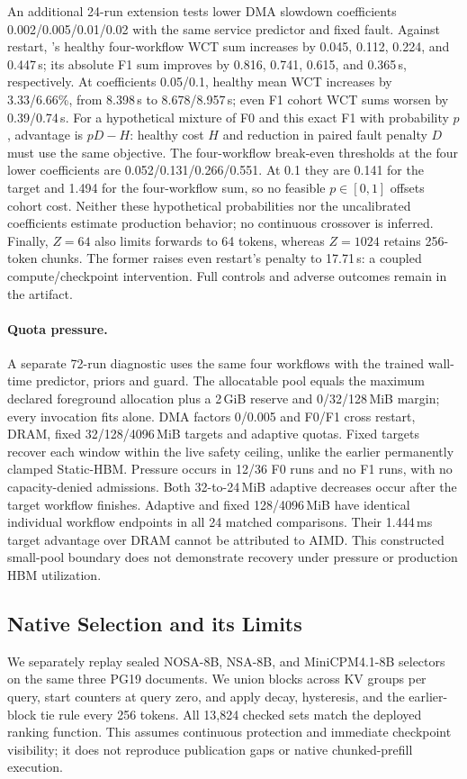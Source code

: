 An additional 24-run extension tests lower DMA slowdown coefficients
0.002/0.005/0.01/0.02 with the same service predictor and fixed fault.
Against restart, \system's healthy four-workflow WCT sum increases by
0.045, 0.112, 0.224, and 0.447\,s; its absolute F1 sum improves by
0.816, 0.741, 0.615, and 0.365\,s, respectively. At coefficients 0.05/0.1, healthy mean WCT
increases by 3.33/6.66\%, from 8.398\,s to 8.678/8.957\,s;
even F1 cohort WCT sums worsen by 0.39/0.74\,s.
For a hypothetical mixture of F0 and this exact
F1 with probability $p$, advantage is $pD-H$: healthy cost $H$ and reduction
in paired fault penalty $D$ must use the same objective. The four-workflow
break-even thresholds at the four lower coefficients are
0.052/0.131/0.266/0.551. At 0.1 they are 0.141 for the target and 1.494
for the four-workflow sum, so no feasible $p\in[0,1]$ offsets cohort cost.
Neither these hypothetical probabilities nor the uncalibrated coefficients
estimate production behavior; no continuous crossover is inferred.
Finally, $Z=64$ also limits forwards to 64 tokens, whereas $Z=1024$ retains
256-token chunks. The former raises even restart's penalty to 17.71\,s:
a coupled compute/checkpoint intervention. Full controls and adverse outcomes
remain in the artifact.

\paragraph{Quota pressure.}
A separate 72-run diagnostic uses the same four workflows with the trained
wall-time predictor, priors and guard. The allocatable pool equals the maximum
declared foreground allocation plus a 2\,GiB reserve and 0/32/128\,MiB margin;
every invocation fits alone. DMA factors 0/0.005 and F0/F1 cross restart,
DRAM, fixed 32/128/4096\,MiB targets and adaptive quotas. Fixed targets recover
each window within the live safety ceiling, unlike the earlier permanently
clamped Static-HBM. Pressure occurs in 12/36 F0 runs and no F1 runs, with no
capacity-denied admissions. Both 32-to-24\,MiB adaptive decreases occur after
the target workflow finishes. Adaptive and fixed 128/4096\,MiB have identical
individual workflow endpoints in all 24 matched comparisons. Their 1.444\,ms
target advantage over DRAM cannot be attributed to AIMD. This constructed
small-pool boundary does not demonstrate recovery under pressure or production
HBM utilization.

\subsection{Native Selection and its Limits}
\label{sec:eval-native}
We separately replay sealed NOSA-8B, NSA-8B, and MiniCPM4.1-8B selectors on the
same three PG19 documents. We union blocks across KV groups per query, start
counters at query zero, and apply decay, hysteresis, and the earlier-block tie
rule every 256 tokens. All 13,824 checked sets match the deployed ranking
function. This assumes continuous protection and immediate checkpoint visibility;
it does not reproduce publication gaps or native chunked-prefill execution.

